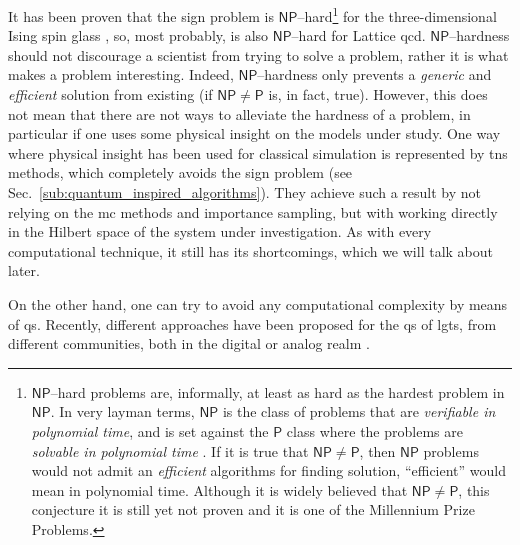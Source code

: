 It has been proven that the sign problem is $\mathsf{NP}$--hard\footnote{
    $\mathsf{NP}$--hard problems are, informally, at least as hard as the hardest problem in $\mathsf{NP}$.
    In very layman terms, $\mathsf{NP}$ is the class of problems that are \emph{verifiable in polynomial time}, and is set against the $\mathsf{P}$ class where the problems are \emph{solvable in polynomial time} \cite{arora2009computational}.
    If it is true that $\mathsf{NP} \neq \mathsf{P}$, then $\mathsf{NP}$ problems would not admit an \emph{efficient} algorithms for finding solution, ``efficient'' would mean in polynomial time.
    Although it is widely believed that $\mathsf{NP} \neq \mathsf{P}$, this conjecture it is still yet not proven and it is one of the Millennium Prize Problems.
}
for the three-dimensional Ising spin glass \cite{troyer2005fermionioc}, so, most probably, is also $\mathsf{NP}$--hard for Lattice \ac{qcd}.
$\mathsf{NP}$--hardness should not discourage a scientist from trying to solve a problem, rather it is what makes a problem interesting.
Indeed, $\mathsf{NP}$--hardness only prevents a \emph{generic} and \emph{efficient} solution from existing (if $\mathsf{NP} \neq \mathsf{P}$ is, in fact, true).
However, this does not mean that there are not ways to alleviate the hardness of a problem, in particular if one uses some physical insight on the models under study.
One way where physical insight has been used for classical simulation is represented by \acp{tn} methods, which completely avoids the sign problem (see Sec.~\ref{sub:quantum_inspired_algorithms}).
They achieve such a result by not relying on the \ac{mc} methods and importance sampling, but with working directly in the Hilbert space of the system under investigation.
As with every computational technique, it still has its shortcomings, which we will talk about later.

On the other hand, one can try to avoid any computational complexity by means of \ac{qs}.
Recently, different approaches have been proposed for the \ac{qs} of \ac{lgt}s, from different communities, both in the digital or analog realm \cite{banuls2020lgtreview, dalmonte2016lgtreview, banuls2020simulating}.

